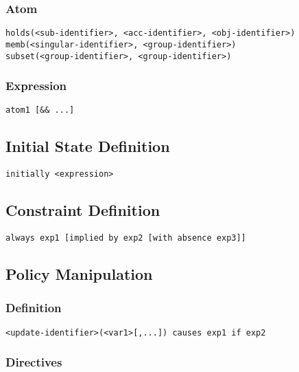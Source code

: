 \documentclass{llncs}
\begin{document}
      \subsubsection{Atom}
        \begin{verbatim}
holds(<sub-identifier>, <acc-identifier>, <obj-identifier>)
memb(<singular-identifier>, <group-identifier>)
subset(<group-identifier>, <group-identifier>)
        \end{verbatim}
      \subsubsection{Expression}
        \begin{verbatim}
atom1 [&& ...]
        \end{verbatim}

    \subsection{Initial State Definition}

      \begin{verbatim}
initially <expression>
      \end{verbatim}

    \subsection{Constraint Definition}

      \begin{verbatim}
always exp1 [implied by exp2 [with absence exp3]]
      \end{verbatim}

    \subsection{Policy Manipulation}

      \subsubsection{Definition}

        \begin{verbatim}
<update-identifier>(<var1>[,...]) causes exp1 if exp2
        \end{verbatim}

      \subsubsection{Directives}
\end{document}
